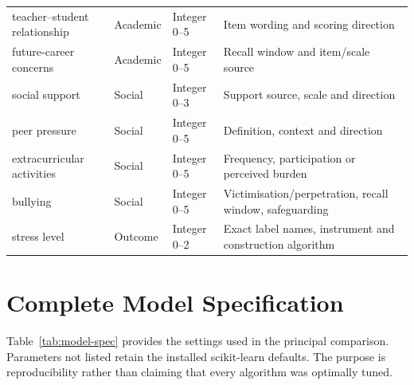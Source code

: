 \documentclass[review]{elsarticle}
\begin{document}
{\begin{longtable}{p{2.0cm}p{2.0cm}p{2.0cm}p{4.3cm}}
teacher--student relationship & Academic & Integer 0--5 & Item wording and scoring direction \\
future-career concerns & Academic & Integer 0--5 & Recall window and item/scale source \\
social support & Social & Integer 0--3 & Support source, scale and direction \\
peer pressure & Social & Integer 0--5 & Definition, context and direction \\
extracurricular activities & Social & Integer 0--5 & Frequency, participation or perceived burden \\
bullying & Social & Integer 0--5 & Victimisation/perpetration, recall window, safeguarding \\
stress level & Outcome & Integer 0--2 & Exact label names, instrument and construction algorithm \\
\end{longtable}
}

\clearpage
\section{Complete Model Specification}\label{app:models}
Table~\ref{tab:model-spec} provides the settings used in the principal comparison. Parameters not listed retain the installed scikit-learn defaults. The purpose is reproducibility rather than claiming that every algorithm was optimally tuned.
\end{document}
